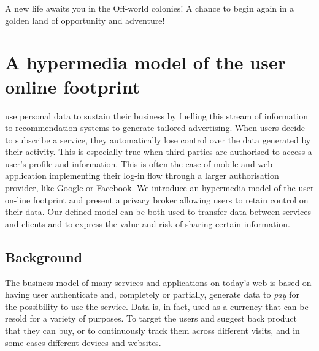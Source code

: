 \begin{savequote}[75mm]
A new life awaits you in the Off-world colonies! A chance to begin again in a golden land of opportunity and adventure!
\end{savequote}

\chapter{A hypermedia model of the user on\hyph line footprint}

 use personal data to sustain their business by fuelling this stream of information to recommendation systems to generate tailored advertising. When users decide to subscribe a service, they automatically lose control over the data generated by their activity. This is especially true when third parties are authorised to access a user's profile and information. This is often the case of mobile and web application implementing their log-in flow through a larger authorisation provider, like Google or Facebook. We introduce an hypermedia model of the user on-line footprint and present a privacy broker allowing users to retain control on their data. Our defined model can be both used to transfer data between services and clients and to express the value and risk of sharing certain information.

\section{Background}

The business model of many services and applications on today's web is based on having user authenticate and, completely or partially, generate data to \emph{pay} for the possibility to use the service. Data is, in fact, used as a currency that can be resold for a variety of purposes. To target the users and suggest back product that they can buy, or to continuously track them across different visits, and in some cases different devices and websites.

